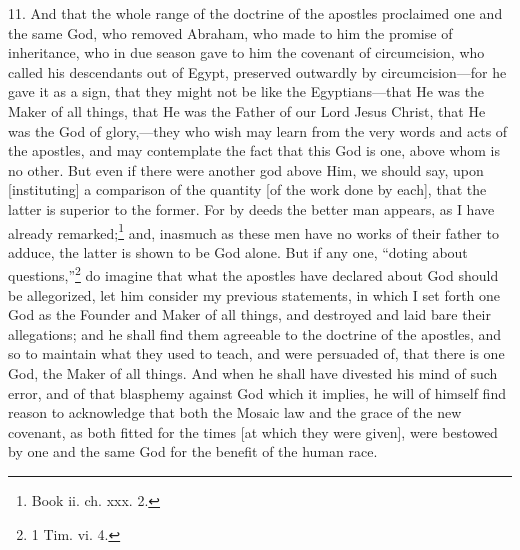 11. And that the whole range of the doctrine of the apostles proclaimed one and the same God, who removed Abraham, who made to him the promise of inheritance, who in due season gave to him the covenant of circumcision, who called his descendants out of Egypt, preserved outwardly by circumcision—for he gave it as a sign, that they might not be like the Egyptians—that He was the Maker of all things, that He was the Father of our Lord Jesus Christ, that He was the God of glory,—they who wish may learn from the very words and acts of the apostles, and may contemplate the fact that this God is one, above whom is no other. But even if there were another god above Him, we should say, upon [instituting] a comparison of the quantity [of the work done by each], that the latter is superior to the former. For by deeds the better man appears, as I have already remarked;\footnote{Book ii. ch. xxx. 2.} and, inasmuch as these men have no works of their father to adduce, the latter is shown to be God alone. But if any one, “doting about questions,”\footnote{1 Tim. vi. 4.} do imagine that what the apostles have declared about God should be allegorized, let him consider my previous statements, in which I set forth one God as the Founder and Maker of all things, and destroyed and laid bare their allegations; and he shall find them agreeable to the doctrine of the apostles, and so to maintain what they used to teach, and were persuaded of, that there is one God, the Maker of all things. And when he shall have divested his mind of such error, and of that blasphemy against God which it implies, he will of himself find reason to acknowledge that both the Mosaic law and the grace of the new covenant, as both fitted for the times [at which they were given], were bestowed by one and the same God for the benefit of the human race.

